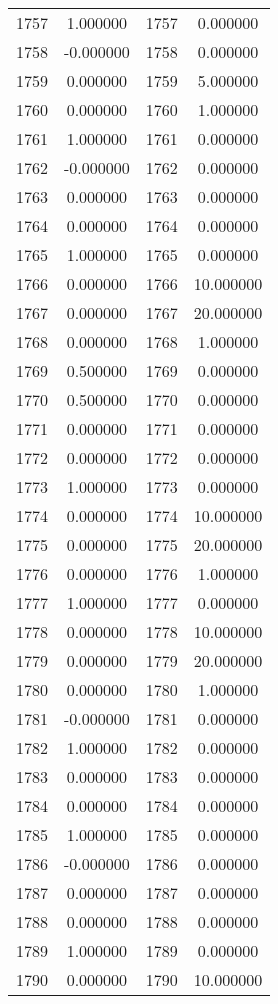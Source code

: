 \documentclass[12pt]{article}
\begin{document}
\begin{longtable}{@{}cccc@{}}
1757 & 1.000000 & 1757 & 0.000000 \\
1758 & -0.000000 & 1758 & 0.000000 \\
1759 & 0.000000 & 1759 & 5.000000 \\
1760 & 0.000000 & 1760 & 1.000000 \\
1761 & 1.000000 & 1761 & 0.000000 \\
1762 & -0.000000 & 1762 & 0.000000 \\
1763 & 0.000000 & 1763 & 0.000000 \\
1764 & 0.000000 & 1764 & 0.000000 \\
1765 & 1.000000 & 1765 & 0.000000 \\
1766 & 0.000000 & 1766 & 10.000000 \\
1767 & 0.000000 & 1767 & 20.000000 \\
1768 & 0.000000 & 1768 & 1.000000 \\
1769 & 0.500000 & 1769 & 0.000000 \\
1770 & 0.500000 & 1770 & 0.000000 \\
1771 & 0.000000 & 1771 & 0.000000 \\
1772 & 0.000000 & 1772 & 0.000000 \\
1773 & 1.000000 & 1773 & 0.000000 \\
1774 & 0.000000 & 1774 & 10.000000 \\
1775 & 0.000000 & 1775 & 20.000000 \\
1776 & 0.000000 & 1776 & 1.000000 \\
1777 & 1.000000 & 1777 & 0.000000 \\
1778 & 0.000000 & 1778 & 10.000000 \\
1779 & 0.000000 & 1779 & 20.000000 \\
1780 & 0.000000 & 1780 & 1.000000 \\
1781 & -0.000000 & 1781 & 0.000000 \\
1782 & 1.000000 & 1782 & 0.000000 \\
1783 & 0.000000 & 1783 & 0.000000 \\
1784 & 0.000000 & 1784 & 0.000000 \\
1785 & 1.000000 & 1785 & 0.000000 \\
1786 & -0.000000 & 1786 & 0.000000 \\
1787 & 0.000000 & 1787 & 0.000000 \\
1788 & 0.000000 & 1788 & 0.000000 \\
1789 & 1.000000 & 1789 & 0.000000 \\
1790 & 0.000000 & 1790 & 10.000000 \\

\end{longtable}
\end{document}
